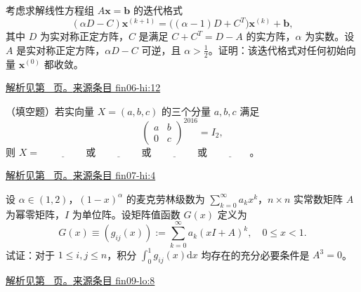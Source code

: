 \documentclass[12pt,fontset=fandol]{ctexart}
\begin{document}
\begin{example}\label{ex:fin06-hi:12}

考虑求解线性方程组 $A\mathbf x=\mathbf b$ 的迭代格式
\[
(\alpha D-C)\mathbf x^{(k+1)}=\bigl((\alpha-1)D+C^{T}\bigr)\mathbf x^{(k)}+\mathbf b,
\]
其中 $D$ 为实对称正定方阵，$C$ 是满足 $C+C^{T}=D-A$ 的实方阵，$\alpha$ 为实数。设 $A$ 是实对称正定方阵，$\alpha D-C$ 可逆，且 $\alpha>\frac12$。证明：该迭代格式对任何初始向量 $\mathbf x^{(0)}$ 都收敛。

\par\hyperref[ans:fin06-hi:12]{解析见第~\pageref{ans:fin06-hi:12} 页。}\quad\href{https://github.com/lzxcr/cmc-mathematics/blob/64916fa1fdbc3e444a652eca204d5669058ee321/src/problems/finals/06/13.md}{来源条目 fin06-hi:12}

\end{example}

\begin{example}\label{ex:fin07-hi:4}

（填空题）若实向量 $X=\left(a,b,c\right)$ 的三个分量 $a,b,c$ 满足
\[
\begin{pmatrix} a & b \\ 0 & c \end{pmatrix}^{2016}=I_{2},
\]
则 $X=$ $\underline{\qquad\qquad}$ 或 $\underline{\qquad\qquad}$ 或 $\underline{\qquad\qquad}$ 或 $\underline{\qquad\qquad}$。

\par\hyperref[ans:fin07-hi:4]{解析见第~\pageref{ans:fin07-hi:4} 页。}\quad\href{https://github.com/lzxcr/cmc-mathematics/blob/64916fa1fdbc3e444a652eca204d5669058ee321/src/problems/finals/07/04.md}{来源条目 fin07-hi:4}

\end{example}

\begin{example}\label{ex:fin09-lo:8}

设 $\alpha \in (1, 2)$，$(1 - x)^{\alpha}$ 的麦克劳林级数为 $\sum_{k=0}^{\infty} a_k x^k$，$n \times n$ 实常数矩阵 $A$ 为幂零矩阵，$I$ 为单位阵。设矩阵值函数 $G(x)$ 定义为
\[
G(x) \equiv \left( g_{ij}(x) \right) := \sum_{k=0}^{\infty} a_k (xI + A)^k, \quad 0 \leq x < 1.
\]
试证：对于 $1 \leq i, j \leq n$，积分 $\int_0^1 g_{ij}(x) \mathrm{d}x$ 均存在的充分必要条件是 $A^3 = 0$。

\par\hyperref[ans:fin09-lo:8]{解析见第~\pageref{ans:fin09-lo:8} 页。}\quad\href{https://github.com/lzxcr/cmc-mathematics/blob/64916fa1fdbc3e444a652eca204d5669058ee321/src/problems/finals/09/08.md}{来源条目 fin09-lo:8}

\end{example}
\end{document}

